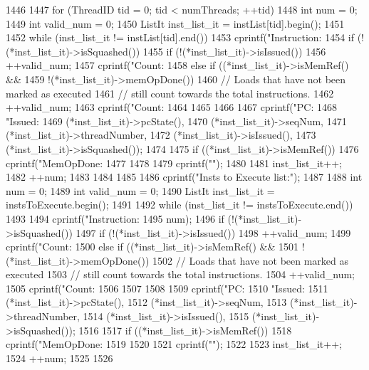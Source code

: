 \begin{DoxyCode}
1446 {
1447     for (ThreadID tid = 0; tid < numThreads; ++tid) {
1448         int num = 0;
1449         int valid_num = 0;
1450         ListIt inst_list_it = instList[tid].begin();
1451 
1452         while (inst_list_it != instList[tid].end()) {
1453             cprintf("Instruction:%
1454             if (!(*inst_list_it)->isSquashed()) {
1455                 if (!(*inst_list_it)->isIssued()) {
1456                     ++valid_num;
1457                     cprintf("Count:%
1458                 } else if ((*inst_list_it)->isMemRef() &&
1459                            !(*inst_list_it)->memOpDone()) {
1460                     // Loads that have not been marked as executed
1461                     // still count towards the total instructions.
1462                     ++valid_num;
1463                     cprintf("Count:%
1464                 }
1465             }
1466 
1467             cprintf("PC: %
1468                     "Issued:%
1469                     (*inst_list_it)->pcState(),
1470                     (*inst_list_it)->seqNum,
1471                     (*inst_list_it)->threadNumber,
1472                     (*inst_list_it)->isIssued(),
1473                     (*inst_list_it)->isSquashed());
1474 
1475             if ((*inst_list_it)->isMemRef()) {
1476                 cprintf("MemOpDone:%
1477             }
1478 
1479             cprintf("\n");
1480 
1481             inst_list_it++;
1482             ++num;
1483         }
1484     }
1485 
1486     cprintf("Insts to Execute list:\n");
1487 
1488     int num = 0;
1489     int valid_num = 0;
1490     ListIt inst_list_it = instsToExecute.begin();
1491 
1492     while (inst_list_it != instsToExecute.end())
1493     {
1494         cprintf("Instruction:%
1495                 num);
1496         if (!(*inst_list_it)->isSquashed()) {
1497             if (!(*inst_list_it)->isIssued()) {
1498                 ++valid_num;
1499                 cprintf("Count:%
1500             } else if ((*inst_list_it)->isMemRef() &&
1501                        !(*inst_list_it)->memOpDone()) {
1502                 // Loads that have not been marked as executed
1503                 // still count towards the total instructions.
1504                 ++valid_num;
1505                 cprintf("Count:%
1506             }
1507         }
1508 
1509         cprintf("PC: %
1510                 "Issued:%
1511                 (*inst_list_it)->pcState(),
1512                 (*inst_list_it)->seqNum,
1513                 (*inst_list_it)->threadNumber,
1514                 (*inst_list_it)->isIssued(),
1515                 (*inst_list_it)->isSquashed());
1516 
1517         if ((*inst_list_it)->isMemRef()) {
1518             cprintf("MemOpDone:%
1519         }
1520 
1521         cprintf("\n");
1522 
1523         inst_list_it++;
1524         ++num;
1525     }
1526 }
\end{DoxyCode}
